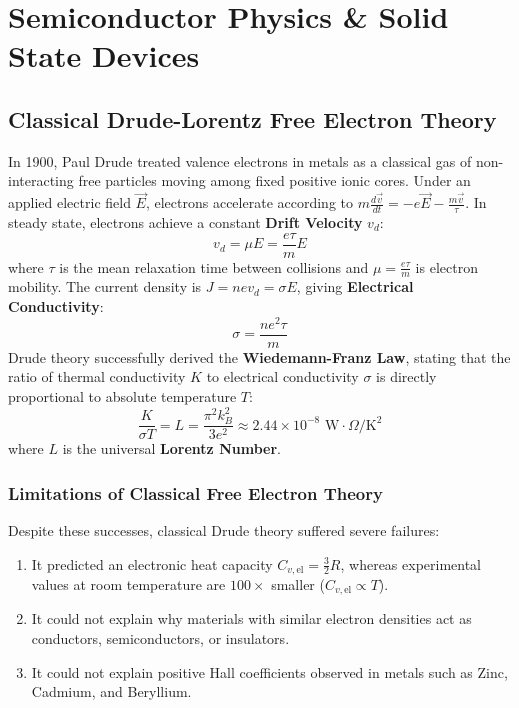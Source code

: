 \chapter{Semiconductor Physics \& Solid State Devices}

\section{Classical Drude-Lorentz Free Electron Theory}
In 1900, Paul Drude treated valence electrons in metals as a classical gas of non-interacting free particles moving among fixed positive ionic cores. Under an applied electric field $\vec{E}$, electrons accelerate according to $m\frac{d\vec{v}}{dt} = -e\vec{E} - \frac{m\vec{v}}{\tau}$.
In steady state, electrons achieve a constant \textbf{Drift Velocity} $v_d$:
\begin{equation}
v_d = \mu E = \frac{e\tau}{m} E
\end{equation}
where $\tau$ is the mean relaxation time between collisions and $\mu = \frac{e\tau}{m}$ is electron mobility.
The current density is $J = n e v_d = \sigma E$, giving \textbf{Electrical Conductivity}:
\begin{equation}
\sigma = \frac{n e^2 \tau}{m}
\end{equation}
Drude theory successfully derived the \textbf{Wiedemann-Franz Law}, stating that the ratio of thermal conductivity $K$ to electrical conductivity $\sigma$ is directly proportional to absolute temperature $T$:
\begin{equation}
\frac{K}{\sigma T} = L = \frac{\pi^2 k_B^2}{3 e^2} \approx 2.44 \times 10^{-8}\text{ W}\cdot\Omega/\text{K}^2
\end{equation}
where $L$ is the universal \textbf{Lorentz Number}.

\subsection{Limitations of Classical Free Electron Theory}
Despite these successes, classical Drude theory suffered severe failures:
\begin{enumerate}[itemsep=2pt]
    \item It predicted an electronic heat capacity $C_{v,\text{el}} = \frac{3}{2} R$, whereas experimental values at room temperature are $100\times$ smaller ($C_{v,\text{el}} \propto T$).
    \item It could not explain why materials with similar electron densities act as conductors, semiconductors, or insulators.
    \item It could not explain positive Hall coefficients observed in metals such as Zinc, Cadmium, and Beryllium.
\end{enumerate}

